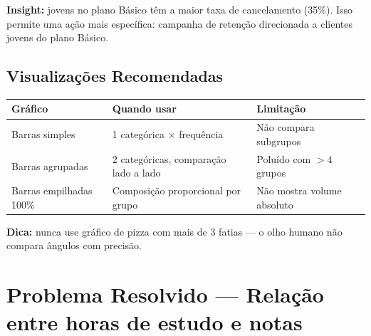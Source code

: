 \textbf{Insight:} jovens no plano Básico têm a maior taxa de cancelamento (35\%). Isso permite uma ação mais específica: campanha de retenção direcionada a clientes jovens do plano Básico.

\subsection*{Visualizações Recomendadas}

\begin{center}
\begin{tabular}{|l|p{5cm}|p{5cm}|}
\hline
\textbf{Gráfico} & \textbf{Quando usar} & \textbf{Limitação} \\
\hline
Barras simples & 1 categórica $\times$ frequência & Não compara subgrupos \\
Barras agrupadas & 2 categóricas, comparação lado a lado & Poluído com $>4$ grupos \\
Barras empilhadas 100\% & Composição proporcional por grupo & Não mostra volume absoluto \\
\hline
\end{tabular}
\end{center}

\textbf{Dica:} nunca use gráfico de pizza com mais de 3 fatias --- o olho humano não compara ângulos com precisão.


\section{Problema Resolvido — Relação entre horas de estudo e notas}

